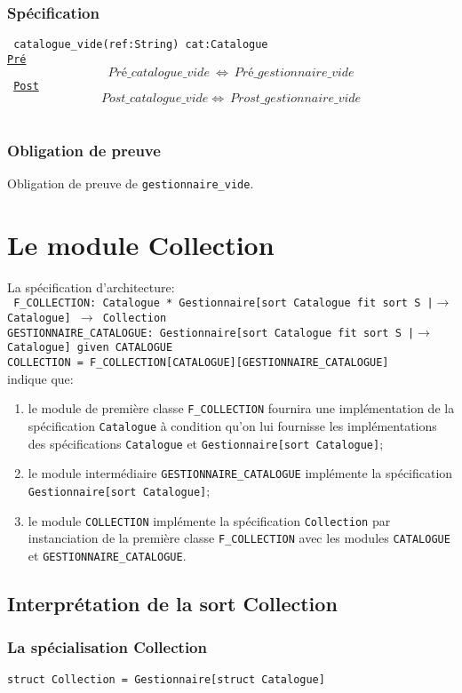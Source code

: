 \documentclass{article}
\begin{document}
\subsubsection{Spécification}
{\tt
catalogue\_vide(ref:String) cat:Catalogue\\
\underline{Pré}
$$ Pré\_catalogue\_vide\ \Leftrightarrow\ Pré\_gestionnaire\_vide $$
\underline{Post}
$$ Post\_catalogue\_vide \Leftrightarrow\ Prost\_gestionnaire\_vide $$
}

\subsubsection{Obligation de preuve}
Obligation de preuve de \texttt{gestionnaire\_vide}.

\section{Le module Collection}
La spécification d'architecture:\\
{\tt
F\_COLLECTION:  Catalogue * Gestionnaire[sort Catalogue fit sort S |$\rightarrow$ Catalogue] $\rightarrow$ Collection\\
GESTIONNAIRE\_CATALOGUE: Gestionnaire[sort Catalogue fit sort S |$\rightarrow$ Catalogue] given CATALOGUE\\
COLLECTION = F\_COLLECTION[CATALOGUE][GESTIONNAIRE\_CATALOGUE]\\
}
indique que:
\begin{enumerate}
\item le module de première classe \texttt{F\_COLLECTION} fournira une implémentation de la spécification \texttt{Catalogue} à condition qu'on lui fournisse les implémentations des spécifications \texttt{Catalogue} et \texttt{Gestionnaire[sort Catalogue]};
\item le module intermédiaire \texttt{GESTIONNAIRE\_CATALOGUE} implémente la spécification \texttt{Gestionnaire[sort Catalogue]};
\item le module \texttt{COLLECTION} implémente la spécification \texttt{Collection} par instanciation de la première classe \texttt{F\_COLLECTION} avec les modules \texttt{CATALOGUE} et \texttt{GESTIONNAIRE\_CATALOGUE}.
\end{enumerate}

\subsection{Interprétation de la sort Collection}
\subsubsection{La spécialisation Collection}
\begin{verbatim}
struct Collection = Gestionnaire[struct Catalogue]
\end{verbatim}
\end{document}
